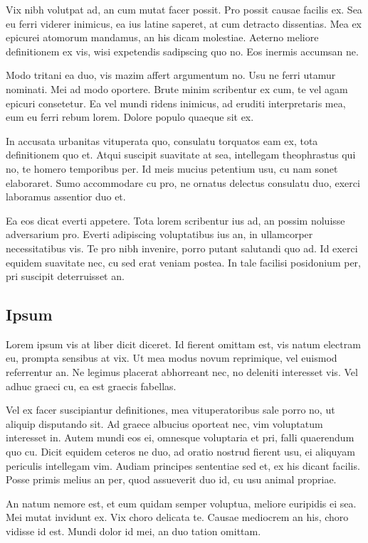 Vix nibh volutpat ad, an cum mutat facer possit. Pro possit causae
facilis ex. Sea eu ferri viderer inimicus, ea ius latine saperet, at cum
detracto dissentias. Mea ex epicurei atomorum mandamus, an his dicam
molestiae. Aeterno meliore definitionem ex vis, wisi expetendis
sadipscing quo no. Eos inermis accumsan ne.

Modo tritani ea duo, vis mazim affert argumentum no. Usu ne ferri utamur
nominati. Mei ad modo oportere. Brute minim scribentur ex cum, te vel
agam epicuri consetetur. Ea vel mundi ridens inimicus, ad eruditi
interpretaris mea, eum eu ferri rebum lorem. Dolore populo quaeque sit
ex.

In accusata urbanitas vituperata quo, consulatu torquatos eam ex, tota
definitionem quo et. Atqui suscipit suavitate at sea, intellegam
theophrastus qui no, te homero temporibus per. Id meis mucius petentium
usu, cu nam sonet elaboraret. Sumo accommodare cu pro, ne ornatus
delectus consulatu duo, exerci laboramus assentior duo et.

Ea eos dicat everti appetere. Tota lorem scribentur ius ad, an possim
noluisse adversarium pro. Everti adipiscing voluptatibus ius an, in
ullamcorper necessitatibus vis. Te pro nibh invenire, porro putant
salutandi quo ad. Id exerci equidem suavitate nec, cu sed erat veniam
postea. In tale facilisi posidonium per, pri suscipit deterruisset an.

\subsection{Ipsum}\label{ipsum}

Lorem ipsum vis at liber dicit diceret. Id fierent omittam est, vis
natum electram eu, prompta sensibus at vix. Ut mea modus novum
reprimique, vel euismod referrentur an. Ne legimus placerat abhorreant
nec, no deleniti interesset vis. Vel adhuc graeci cu, ea est graecis
fabellas.

Vel ex facer suscipiantur definitiones, mea vituperatoribus sale porro
no, ut aliquip disputando sit. Ad graece albucius oporteat nec, vim
voluptatum interesset in. Autem mundi eos ei, omnesque voluptaria et
pri, falli quaerendum quo cu. Dicit equidem ceteros ne duo, ad oratio
nostrud fierent usu, ei aliquyam periculis intellegam vim. Audiam
principes sententiae sed et, ex his dicant facilis. Posse primis melius
an per, quod assueverit duo id, cu usu animal propriae.

An natum nemore est, et eum quidam semper voluptua, meliore euripidis ei
sea. Mei mutat invidunt ex. Vix choro delicata te. Causae mediocrem an
his, choro vidisse id est. Mundi dolor id mei, an duo tation omittam.

